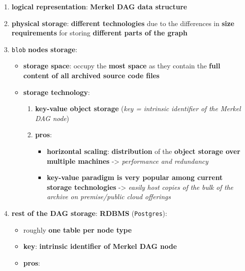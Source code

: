 \documentclass[11pt]{article}
\providecommand{\tightlist}{%
      \setlength{\itemsep}{0pt}\setlength{\parskip}{0pt}}
\begin{document}
\begin{enumerate}
\def\labelenumi{\arabic{enumi}.}
\tightlist
\item
  \textbf{logical representation}: \textbf{Merkel DAG data structure}
\item
  \textbf{physical storage}: \textbf{different technologies} due to the
  differences in \textbf{size requirements} for storing
  \textbf{different parts of the graph}
\item
  \texttt{blob} \textbf{nodes storage}:

  \begin{itemize}
  \tightlist
  \item
    \textbf{storage space}: occupy the \textbf{most space} as they
    contain the \textbf{full content of all archived source code files}
  \item
    \textbf{storage technology}:

    \begin{enumerate}
    \def\labelenumii{\arabic{enumii}.}
    \tightlist
    \item
      \textbf{key-value object storage} (\emph{key = intrinsic
      identifier of the Merkel DAG node})
    \item
      \textbf{pros}:

      \begin{itemize}
      \tightlist
      \item
        \textbf{horizontal scaling}: \textbf{distribution} of the
        \textbf{object storage over multiple machines} -\textgreater{}
        \emph{performance and redundancy}
      \item
        \textbf{key-value paradigm is very popular among current storage
        technologies} -\textgreater{} \emph{easily host copies of the
        bulk of the archive on premise/public cloud offerings}
      \end{itemize}
    \end{enumerate}
  \end{itemize}
\item
  \textbf{rest of the DAG storage}: \textbf{RDBMS} (\texttt{Postgres}):

  \begin{itemize}
  \tightlist
  \item
    roughly \textbf{one table per node type}
  \item
    \textbf{key}: \textbf{intrinsic identifier of Merkel DAG node}
  \item
    \textbf{pros}:


\end{itemize}
\end{enumerate}
\end{document}
